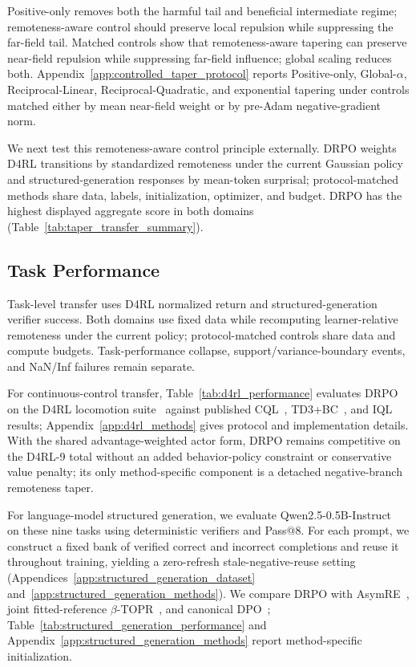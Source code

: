 \documentclass{article}
\theoremstyle{plain}
\theoremstyle{definition}
\theoremstyle{remark}
\begin{document}
Positive-only removes both the harmful tail and beneficial intermediate
regime; remoteness-aware control should preserve local repulsion while
suppressing the far-field tail.
Matched controls show that remoteness-aware tapering can preserve near-field
repulsion while suppressing far-field influence; global scaling reduces both. Appendix~\ref{app:controlled_taper_protocol} reports
Positive-only, Global-$\alpha$, Reciprocal-Linear, Reciprocal-Quadratic, and
exponential tapering under controls matched either by mean near-field weight
or by pre-Adam negative-gradient norm.



We next test this remoteness-aware control principle externally. DRPO weights
D4RL transitions by standardized remoteness under the current Gaussian policy
and structured-generation responses by mean-token surprisal; protocol-matched
methods share data, labels, initialization, optimizer, and budget.
DRPO has the highest displayed aggregate score in both domains
(Table~\ref{tab:taper_transfer_summary}).

\subsection{Task Performance}
\label{sec:overall_performance}

Task-level transfer uses D4RL normalized return and structured-generation
verifier success. Both domains use fixed data while recomputing learner-relative
remoteness under the current policy; protocol-matched controls share data and
compute budgets. Task-performance collapse, support/variance-boundary events,
and NaN/Inf failures remain separate.

For continuous-control transfer, Table~\ref{tab:d4rl_performance} evaluates
DRPO on the D4RL locomotion suite~\citep{fu2020d4rl} against published
CQL~\citep{kumar2020conservative}, TD3+BC~\citep{fujimoto2021minimalist},
and IQL~\citep{kostrikov2021offline} results; Appendix~\ref{app:d4rl_methods}
gives protocol and implementation details.
With the shared advantage-weighted actor form, DRPO remains competitive on
the D4RL-9 total without an added behavior-policy constraint or conservative value
penalty; its only method-specific component is a detached negative-branch
remoteness taper.

For language-model structured generation, we evaluate
Qwen2.5-0.5B-Instruct~\citep{qwen2024qwen25} on these nine tasks using
deterministic verifiers and Pass@8. For each prompt, we construct a fixed bank of verified correct
and incorrect completions and reuse it throughout training, yielding a
zero-refresh stale-negative-reuse setting
(Appendices~\ref{app:structured_generation_dataset}
and~\ref{app:structured_generation_methods}).
We compare DRPO with AsymRE~\citep{arnal2025asymmetric}, joint
fitted-reference \(\beta\)-TOPR~\citep{leroux2025tapered}, and canonical
DPO~\citep{rafailov2023direct}; Table~\ref{tab:structured_generation_performance}
and Appendix~\ref{app:structured_generation_methods} report method-specific
initialization.
\end{document}
